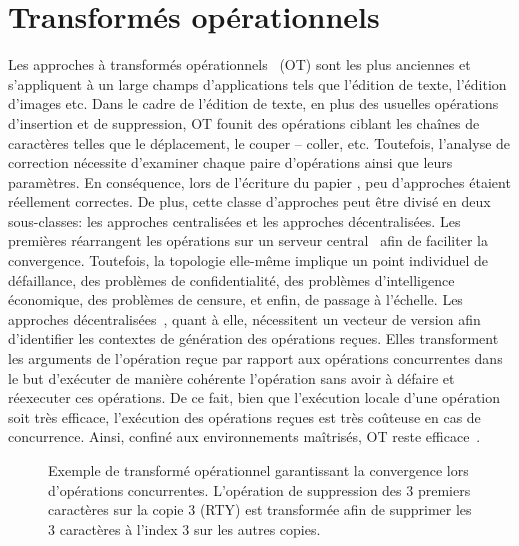 
\section{Transformés opérationnels}

Les approches à transformés opérationnels~\cite{sun1998operational,
  sun2009contextbased} (OT) sont les plus anciennes et s'appliquent à un large
champs d'applications tels que l'édition de texte, l'édition d'images etc. Dans
le cadre de l'édition de texte, en plus des usuelles opérations d'insertion et
de suppression, OT founit des opérations ciblant les chaînes de caractères
telles que le déplacement, le couper -- coller, etc. Toutefois, l'analyse de
correction nécessite d'examiner chaque paire d'opérations ainsi que leurs
paramètres. En conséquence, lors de l'écriture du papier
\cite{imine2003proving}, peu d'approches étaient réellement correctes. De plus,
cette classe d'approches peut être divisé en deux sous-classes: les approches
centralisées et les approches décentralisées. Les premières réarrangent les
opérations sur un serveur central~\cite{nichols1995high} afin de faciliter la
convergence. Toutefois, la topologie elle-même implique un point individuel de
défaillance, des problèmes de confidentialité, des problèmes d'intelligence
économique, des problèmes de censure, et enfin, de passage à l'échelle. Les
approches décentralisées~\cite{sun2009contextbased}, quant à elle, nécessitent
un vecteur de version afin d'identifier les contextes de génération des
opérations reçues. Elles transforment les arguments de l'opération reçue par
rapport aux opérations concurrentes dans le but d'exécuter de manière cohérente
l'opération sans avoir à défaire et réexecuter ces opérations. De ce fait, bien
que l'exécution locale d'une opération soit très efficace, l'exécution des
opérations reçues est très coûteuse en cas de concurrence. Ainsi, confiné aux
environnements maîtrisés, OT reste efficace~\cite{mehdi2014merging}.

\begin{figure}
  \centering
  
  \caption{\label{seq:fig:otexample}Exemple de transformé opérationnel
    garantissant la convergence lors d'opérations concurrentes. L'opération de
    suppression des 3 premiers caractères sur la copie 3 (RTY) est transformée
    afin de supprimer les 3 caractères à l'index 3 sur les autres copies.}
\end{figure}

